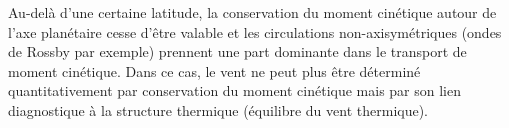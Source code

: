 \sk
Au-delà d'une certaine latitude, la conservation du moment cinétique autour de l'axe planétaire cesse d'être valable et les circulations non-axisymétriques (ondes de Rossby par exemple) prennent une part dominante dans le transport de moment cinétique. Dans ce cas, le vent ne peut plus être déterminé quantitativement par conservation du moment cinétique mais par son lien diagnostique à la structure thermique (équilibre du vent thermique).

